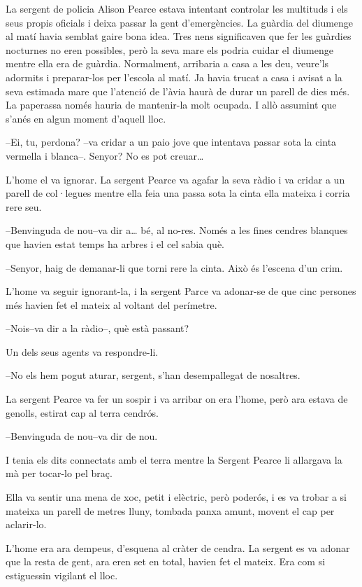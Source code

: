 La sergent de policia Alison Pearce estava intentant controlar les
multituds i els seus propis oficials i deixa passar la gent
d'emergències. La guàrdia del diumenge al matí havia semblat gaire bona
idea. Tres nens significaven que fer les guàrdies nocturnes no eren
possibles, però la seva mare els podria cuidar el diumenge mentre ella
era de guàrdia. Normalment, arribaria a casa a les deu, veure'ls
adormits i preparar-los per l'escola al matí. Ja havia trucat a casa i
avisat a la seva estimada mare que l'atenció de l'àvia haurà de durar un
parell de dies més. La paperassa només hauria de mantenir-la molt
ocupada. I allò assumint que s'anés en algun moment d'aquell lloc.

--Ei, tu, perdona? --va cridar a un paio jove que intentava passar sota
la cinta vermella i blanca--. Senyor? No es pot creuar\ldots{}

L'home el va ignorar. La sergent Pearce va agafar la seva ràdio i va
cridar a un parell de col·legues mentre ella feia una passa sota la
cinta ella mateixa i corria rere seu.

--Benvinguda de nou--va dir a\ldots{} bé, al no-res. Només a les fines
cendres blanques que havien estat temps ha arbres i el cel sabia què.

--Senyor, haig de demanar-li que torni rere la cinta. Això és l'escena
d'un crim.

L'home va seguir ignorant-la, i la sergent Parce va adonar-se de que
cinc persones més havien fet el mateix al voltant del perímetre.

--Nois--va dir a la ràdio--, què està passant?

Un dels seus agents va respondre-li.

--No els hem pogut aturar, sergent, s'han desempallegat de nosaltres.

La sergent Pearce va fer un sospir i va arribar on era l'home, però ara
estava de genolls, estirat cap al terra cendrós.

--Benvinguda de nou--va dir de nou.

I tenia els dits connectats amb el terra mentre la Sergent Pearce li
allargava la mà per tocar-lo pel braç.

Ella va sentir una mena de xoc, petit i elèctric, però poderós, i es va
trobar a si mateixa un parell de metres lluny, tombada panxa amunt,
movent el cap per aclarir-lo.

L'home era ara dempeus, d'esquena al cràter de cendra. La sergent es va
adonar que la resta de gent, ara eren set en total, havien fet el
mateix. Era com si estiguessin vigilant el lloc.

